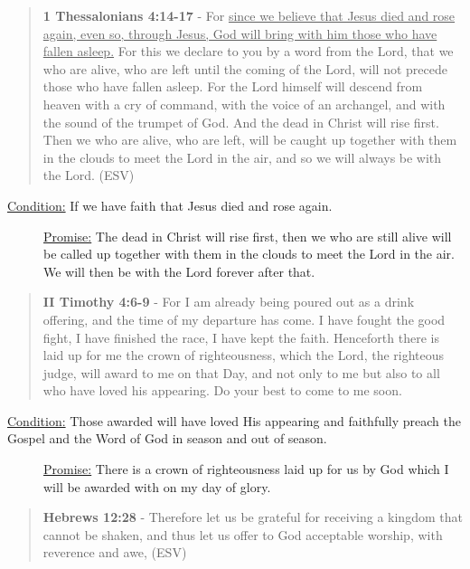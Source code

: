 \documentclass[11pt]{article}
\begin{document}
\begin{quote}
\textbf{1 Thessalonians 4:14-17} - For \uline{since we believe that Jesus died and rose again, even so, through Jesus, God will bring with him those who have fallen asleep.} For this we declare to you by a word from the Lord, that we who are alive, who are left until the coming of the Lord, will not precede those who have fallen asleep. For the Lord himself will descend from heaven with a cry of command, with the voice of an archangel, and with the sound of the trumpet of God. And the dead in Christ will rise first. Then we who are alive, who are left, will be caught up together with them in the clouds to meet the Lord in the air, and so we will always be with the Lord. (ESV)
\end{quote}

\begin{description}
\item[{\uline{Condition:} If we have faith that Jesus died and rose again.}] \uline{Promise:} The dead in Christ will rise first, then we who are still alive will be called up together with them in the clouds to meet the Lord in the air. We will then be with the Lord forever after that.
\end{description}

\begin{quote}
\textbf{II Timothy 4:6-9} - For I am already being poured out as a drink offering, and the time of my departure has come. I have fought the good fight, I have finished the race, I have kept the faith. Henceforth there is laid up for me the crown of righteousness, which the Lord, the righteous judge, will award to me on that Day, and not only to me but also to all who have loved his appearing. Do your best to come to me soon.
\end{quote}

\begin{description}
\item[{\uline{Condition:} Those awarded will have loved His appearing and faithfully preach the Gospel and the Word of God in season and out of season.}] \uline{Promise:} There is a crown of righteousness laid up for us by God which I will be awarded with on my day of glory.
\end{description}

\begin{quote}
\textbf{Hebrews 12:28} - Therefore let us be grateful for receiving a kingdom that cannot be shaken, and thus let us offer to God acceptable worship, with reverence and awe, (ESV)
\end{quote}
\end{document}
